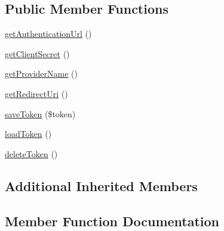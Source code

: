 \subsection*{Public Member Functions}
\begin{DoxyCompactItemize}
\item 
\hyperlink{interface_able_polecat___access_control___role___user___authenticated___o_auth2_interface_a478d961fde0396f26b345a191edcc083}{get\+Authentication\+Url} ()
\item 
\hyperlink{interface_able_polecat___access_control___role___user___authenticated___o_auth2_interface_a1cc836e79ca789c01d99762d254ba6db}{get\+Client\+Secret} ()
\item 
\hyperlink{interface_able_polecat___access_control___role___user___authenticated___o_auth2_interface_ac2ff77dd16a9fd78d2ce4ed0296e78d9}{get\+Provider\+Name} ()
\item 
\hyperlink{interface_able_polecat___access_control___role___user___authenticated___o_auth2_interface_a88c1eb6bab4e8e82b51172e5e90016e5}{get\+Redirect\+Uri} ()
\item 
\hyperlink{interface_able_polecat___access_control___role___user___authenticated___o_auth2_interface_a9331d75ce8b6f49037a42a1a3a57aac9}{save\+Token} (\$token)
\item 
\hyperlink{interface_able_polecat___access_control___role___user___authenticated___o_auth2_interface_a5126349c471fcaff1a74b9d117b979b1}{load\+Token} ()
\item 
\hyperlink{interface_able_polecat___access_control___role___user___authenticated___o_auth2_interface_ab36a5e24703a28cb22fde1a404dab358}{delete\+Token} ()
\end{DoxyCompactItemize}
\subsection*{Additional Inherited Members}


\subsection{Member Function Documentation}
\hypertarget{interface_able_polecat___access_control___role___user___authenticated___o_auth2_interface_ab36a5e24703a28cb22fde1a404dab358}{}
